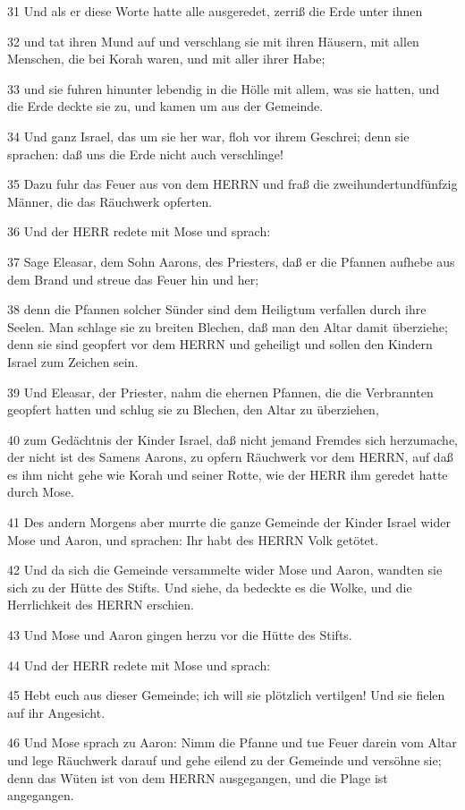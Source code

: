 \par 31 Und als er diese Worte hatte alle ausgeredet, zerriß die Erde unter ihnen
\par 32 und tat ihren Mund auf und verschlang sie mit ihren Häusern, mit allen Menschen, die bei Korah waren, und mit aller ihrer Habe;
\par 33 und sie fuhren hinunter lebendig in die Hölle mit allem, was sie hatten, und die Erde deckte sie zu, und kamen um aus der Gemeinde.
\par 34 Und ganz Israel, das um sie her war, floh vor ihrem Geschrei; denn sie sprachen: daß uns die Erde nicht auch verschlinge!
\par 35 Dazu fuhr das Feuer aus von dem HERRN und fraß die zweihundertundfünfzig Männer, die das Räuchwerk opferten.
\par 36 Und der HERR redete mit Mose und sprach:
\par 37 Sage Eleasar, dem Sohn Aarons, des Priesters, daß er die Pfannen aufhebe aus dem Brand und streue das Feuer hin und her;
\par 38 denn die Pfannen solcher Sünder sind dem Heiligtum verfallen durch ihre Seelen. Man schlage sie zu breiten Blechen, daß man den Altar damit überziehe; denn sie sind geopfert vor dem HERRN und geheiligt und sollen den Kindern Israel zum Zeichen sein.
\par 39 Und Eleasar, der Priester, nahm die ehernen Pfannen, die die Verbrannten geopfert hatten und schlug sie zu Blechen, den Altar zu überziehen,
\par 40 zum Gedächtnis der Kinder Israel, daß nicht jemand Fremdes sich herzumache, der nicht ist des Samens Aarons, zu opfern Räuchwerk vor dem HERRN, auf daß es ihm nicht gehe wie Korah und seiner Rotte, wie der HERR ihm geredet hatte durch Mose.
\par 41 Des andern Morgens aber murrte die ganze Gemeinde der Kinder Israel wider Mose und Aaron, und sprachen: Ihr habt des HERRN Volk getötet.
\par 42 Und da sich die Gemeinde versammelte wider Mose und Aaron, wandten sie sich zu der Hütte des Stifts. Und siehe, da bedeckte es die Wolke, und die Herrlichkeit des HERRN erschien.
\par 43 Und Mose und Aaron gingen herzu vor die Hütte des Stifts.
\par 44 Und der HERR redete mit Mose und sprach:
\par 45 Hebt euch aus dieser Gemeinde; ich will sie plötzlich vertilgen! Und sie fielen auf ihr Angesicht.
\par 46 Und Mose sprach zu Aaron: Nimm die Pfanne und tue Feuer darein vom Altar und lege Räuchwerk darauf und gehe eilend zu der Gemeinde und versöhne sie; denn das Wüten ist von dem HERRN ausgegangen, und die Plage ist angegangen.
